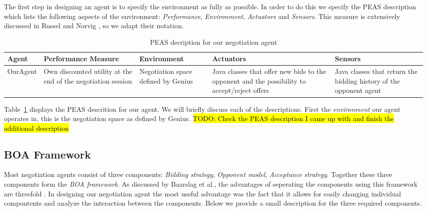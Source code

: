\documentclass[a4paper,10pt]{article}
\newcommand{\todo}[1] {\hl{TODO: #1}}
\begin{document}
The first step in designing an agent is to specify the environment as fully as possible. In order to do this we specify the PEAS description which lists the following aspects of the environment: \emph{Performance}, \emph{Environment}, \emph{Actuators} and \emph{Sensors}. This measure is extensively discussed in Russel and Norvig \cite{russel-norvig}, so we adapt their notation.

\begin{table}[H]
    \begin{tabular}{|p{1.8cm}|p{3cm}|p{3cm}|p{3cm}|p{3cm}|}
    \hline
    \textbf{Agent} & \textbf{Performance \mbox{Measure}} & \textbf{Environment} & \textbf{Actuators} & \textbf{Sensors} \\
    \hline
    OurAgent & Own discounted utility at the end of the negotiation session & Negotiation space defined by Genius & Java classes that offer new bids to the opponent and the possibility to \mbox{accept/reject} offers & Java classes that return the bidding history of the \mbox{opponent} agent \\
    \hline
    \end{tabular}
    
    \caption{PEAS decription for our negotiation agent \label{table:peas-description}}
\end{table}

Table~\ref{table:peas-description} displays the PEAS descrition for our agent. We will briefly discuss each of the descriptions. First the \emph{environment} our agent operates in, this is the negotiation space as defined by Genius. \todo{Check the PEAS description I came up with and finish the additional description} 

\subsection{BOA Framework}

Most negotiation agents consist of three components: \emph{Bidding strategy}, \emph{Opponent model}, \emph{Acceptance strategy}. Together these three components form the \emph{BOA framework}. As discussed by Baarslag et al., the advantages of seperating the components using this framework are threefold \cite{baarslag2012decoupling}. In designing our negotiation agent the most useful advantage was the fact that it allows for easily changing individual compontents and analyze the interaction between the components. Below we provide a small description for the three required components.
\end{document}
